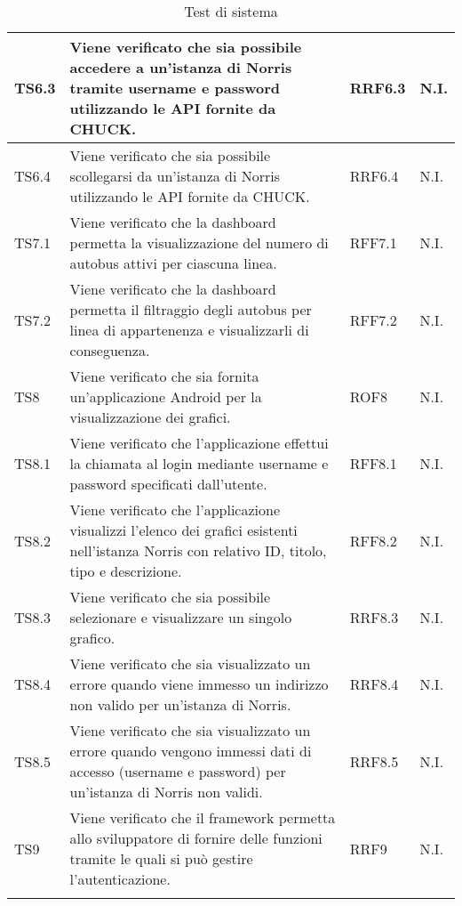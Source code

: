 \begin{longtabu}{| X[0.5] | X | X[0.5] | X[0.4] |}
TS6.3 & Viene verificato che sia possibile accedere a un'istanza di Norris tramite username e password utilizzando le API fornite da CHUCK. & RRF6.3 & N.I.\\ \hline

TS6.4 & Viene verificato che sia possibile scollegarsi da un'istanza di Norris utilizzando le API fornite da CHUCK. & RRF6.4 & N.I.\\ \hline

TS7.1 & Viene verificato che la dashboard permetta la visualizzazione del numero di autobus attivi per ciascuna linea. & RFF7.1 & N.I.\\ \hline

TS7.2 & Viene verificato che la dashboard permetta il filtraggio degli autobus per linea di appartenenza e visualizzarli di conseguenza. & RFF7.2 & N.I.\\ \hline

TS8 & Viene verificato che sia fornita un'applicazione Android per la visualizzazione dei grafici. & ROF8 & N.I.\\ \hline

TS8.1 & Viene verificato che l'applicazione effettui la chiamata al login mediante username e password specificati dall'utente. & RFF8.1 & N.I.\\ \hline

TS8.2 & Viene verificato che l'applicazione visualizzi l'elenco dei grafici esistenti nell'istanza Norris con relativo ID, titolo, tipo e descrizione. & RFF8.2 & N.I.\\ \hline

TS8.3 & Viene verificato che sia possibile selezionare e visualizzare un singolo grafico. & RRF8.3 & N.I.\\ \hline

TS8.4 & Viene verificato che sia visualizzato un errore quando viene immesso un indirizzo non valido per un'istanza di Norris. & RRF8.4 & N.I.\\ \hline

TS8.5 & Viene verificato che sia visualizzato un errore quando vengono immessi dati di accesso (username e password) per un'istanza di Norris non validi. & RRF8.5 & N.I.\\ \hline

TS9 & Viene verificato che il framework permetta allo sviluppatore di fornire delle funzioni tramite le quali si può gestire l'autenticazione. & RRF9 & N.I.\\ \hline

\caption{Test di sistema}

\end{longtabu}